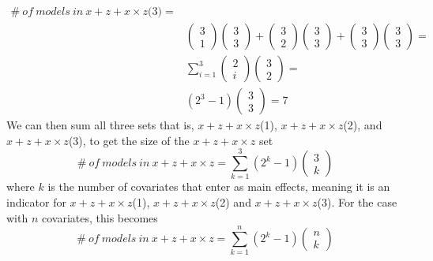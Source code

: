 \begin{equation*}
\begin{aligned}
\#\ of\ models\ in\ x + z + x \times z\textit{(3)}=\\
&\left( \begin{array}{c}
3 \\ 
1 \end{array}
\right)\left( \begin{array}{c}
3 \\ 
3 \end{array}
\right)+\left( \begin{array}{c}
3 \\ 
2 \end{array}
\right)\left( \begin{array}{c}
3 \\ 
3 \end{array}
\right)+\left( \begin{array}{c}
3 \\ 
3 \end{array}
\right)\left( \begin{array}{c}
3 \\ 
3 \end{array}
\right)= \\
&\sum^3_{i=1}{\left( \begin{array}{c}
2 \\ 
i \end{array}
\right)}\left( \begin{array}{c}
3 \\ 
2 \end{array}
\right)= \\
&\left(2^3-1\right)\left( \begin{array}{c}
3 \\ 
3 \end{array}
\right)=7
\end{aligned}
\end{equation*}
We can then sum all three sets that is, $x + z + x \times z$(1), $x + z + x \times z$(2), and $x + z + x \times z$(3), to get the size of the $x + z + x \times z$ set
\[\#\ of\ models\ in\ x + z + x \times z=\sum^3_{k=1}{(2^k-1)\left( \begin{array}{c}
3 \\ 
k \end{array}
\right)}\]where $k$ is the number of covariates that enter as main effects, meaning it is an indicator for $x + z + x \times z$(1), $x + z + x \times z$(2) and $x + z + x \times z$(3). For the case with $n$ covariates, this becomes
\[\#\ of\ models\ in\ x + z + x \times z=\sum^n_{k=1}{(2^k-1)\left( \begin{array}{c}
n \\ 
k \end{array}
\right)}\] 

